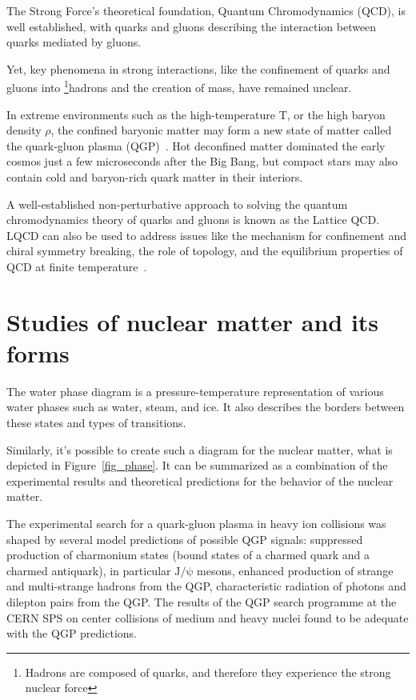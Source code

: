 The Strong Force's theoretical foundation, Quantum Chromodynamics (QCD), is well established, with quarks and gluons describing the interaction between quarks mediated by gluons.

Yet, key phenomena in strong interactions, like the confinement of quarks and gluons into \footnote{Hadrons are composed of quarks, and therefore they experience the strong nuclear force}{hadrons} and the creation of mass, have remained unclear.

In extreme environments such as the high-temperature T, or the high baryon density $\rho$, the confined baryonic matter may form a new state of matter called the quark-gluon plasma (\gls{QGP})~\cite{phase_diagram}. Hot deconfined matter dominated the early cosmos just a few microseconds after the Big Bang, but compact stars may also contain cold and baryon-rich quark matter in their interiors.

A well-established non-perturbative approach to solving the quantum chromodynamics theory of quarks and gluons is known as the Lattice \gls{QCD}. LQCD can also be used to address issues like the mechanism for confinement and chiral symmetry breaking, the role of topology, and the equilibrium properties of \gls{QCD} at finite temperature~\cite{lattice_qcd}. 

\section{Studies of nuclear matter and its forms}
The water phase diagram is a pressure-temperature representation of various water phases such as water, steam, and ice. It also describes the borders between these states and types of transitions. 

Similarly, it's possible to create such a diagram for the nuclear matter, what is depicted in Figure~\ref{fig_phase}. It can be summarized as a combination of the experimental results and theoretical predictions for the behavior of the nuclear matter.

The experimental search for a quark-gluon plasma in heavy ion
collisions was shaped by several model predictions of possible \gls{QGP} signals: suppressed production of charmonium states (bound states of a charmed quark and a charmed antiquark), in particular $\mathrm{J/\psi}$ mesons, enhanced production of strange and multi-strange hadrons from the \gls{QGP}, characteristic radiation of photons and dilepton pairs from the \gls{QGP}. The results of the QGP search programme at the \gls{CERN} \gls{SPS} on center collisions of medium and heavy nuclei found to be adequate with the QGP predictions.

